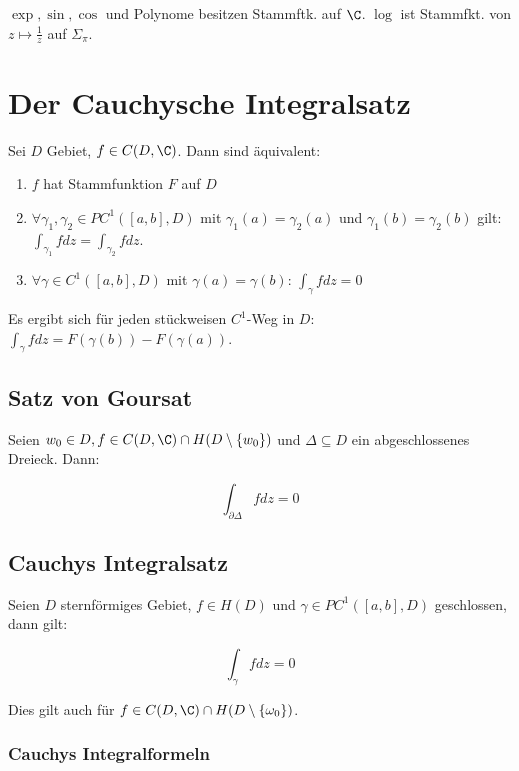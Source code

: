 \(\exp, \sin, \cos\) und Polynome besitzen Stammftk. auf \(\C\). \(\log\) ist Stammfkt. von \(z \mapsto \frac{1}{z}\) auf \(\Sigma_\pi\).

\section*{Der Cauchysche Integralsatz}

Sei \(D\) Gebiet, \(f \in C(D,\C)\). Dann sind äquivalent:

\begin{enumerate}[label=(\alph*)]
	\item \(f\) hat Stammfunktion \(F\) auf \(D\)
	\item \(\forall \gamma_1, \gamma_2 \in PC^1([a,b],D)\) mit \(\gamma_1(a)=\gamma_2(a)\) und \(\gamma_1(b)=\gamma_2(b)\) gilt: \(\int_{\gamma_1} f dz = \int_{\gamma_2} f dz\).
	\item \(\forall \gamma \in C^1([a,b],D)\) mit \(\gamma(a)=\gamma(b)\): \(\int_\gamma f dz = 0\)
\end{enumerate}

Es ergibt sich für jeden stückweisen \(C^1\)-Weg in \(D\): \(\int_\gamma f dz = F(\gamma(b)) - F(\gamma(a))\).

\subsection*{Satz von Goursat}

Seien \(w_0 \in D, f \in C(D,\C) \cap H(D \setminus \{w_0\})\) und \(\Delta \subseteq D\) ein abgeschlossenes Dreieck. Dann:

\vspace*{-2mm}
\[ \int_{\partial\Delta} f dz = 0 \]

\subsection*{Cauchys Integralsatz}

Seien \(D\) sternförmiges Gebiet, \(f \in H(D)\) und \(\gamma \in PC^1([a,b],D)\) geschlossen, dann gilt:

\vspace*{-2mm}
\[ \int_\gamma f dz = 0 \]

Dies gilt auch für \(f \in C(D,\C) \cap H(D\setminus \{\omega_0\})\).

\subsubsection*{Cauchys Integralformeln}

